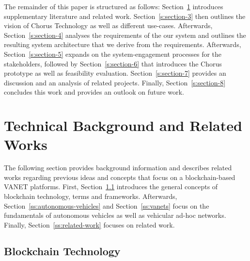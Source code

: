 \documentclass{llncs}
\begin{document}
{		The remainder of this paper is structured as follows: Section~\ref{s:section-2} introduces supplementary literature and related work. Section~\ref{s:section-3} then outlines the vision of Chorus Technology as well as different use-cases. Afterwards, Section~\ref{s:section-4} analyses the requirements of the our system and outlines the resulting system architecture that we derive from the requirements. Afterwards, Section~\ref{s:section-5} expands on the system-engagement processes for the stakeholders, followed by Section~\ref{s:section-6} that introduces the Chorus prototype as well as feasibility evaluation. Section~\ref{s:section-7} provides an discussion and an analysis of related projects. Finally, Section~\ref{s:section-8} concludes this work and provides an outlook on future work.



	\section{Technical Background and Related Works}	
		\label{s:section-2}
		
		The following section provides background information and describes related works regarding previous ideas and concepts that focus on a blockchain-based VANET platforms. First, Section~\ref{ss:blockchain-intro} introduces the general concepts of blockchain technology, terms and frameworks. Afterwards, Section~\ref{ss:autonomous-vehicles} and Section~\ref{ss:vanets} focus on the fundamentals of autonomous vehicles as well as vehicular ad-hoc networks. Finally, Section~\ref{ss:related-work} focuses on related work.	
					
		
		\subsection{Blockchain Technology}
			\label{ss:blockchain-intro}
			
}
\end{document}
